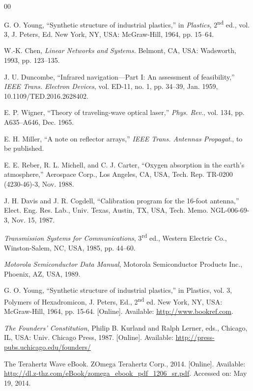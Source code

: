 \documentclass[journal,twoside,web]{ieeecolor}
\begin{document}
\begin{thebibliography}{00}

 G. O. Young, ``Synthetic structure of industrial plastics,'' in \emph{Plastics,} 2\textsuperscript{nd} ed., vol. 3, J. Peters, Ed. New York, NY, USA: McGraw-Hill, 1964, pp. 15--64.

 W.-K. Chen, \emph{Linear Networks and Systems.} Belmont, CA, USA: Wadsworth, 1993, pp. 123--135.

 J. U. Duncombe, ``Infrared navigation---Part I: An assessment of feasibility,'' \emph{IEEE Trans. Electron Devices}, vol. ED-11, no. 1, pp. 34--39, Jan. 1959, 10.1109/TED.2016.2628402.

 E. P. Wigner, ``Theory of traveling-wave optical laser,'' \emph{Phys. Rev}., vol. 134, pp. A635--A646, Dec. 1965.

 E. H. Miller, ``A note on reflector arrays,'' \emph{IEEE Trans. Antennas Propagat}., to be published.

 E. E. Reber, R. L. Michell, and C. J. Carter, ``Oxygen absorption in the earth's atmosphere,'' Aerospace Corp., Los Angeles, CA, USA, Tech. Rep. TR-0200 (4230-46)-3, Nov. 1988.

 J. H. Davis and J. R. Cogdell, ``Calibration program for the 16-foot antenna,'' Elect. Eng. Res. Lab., Univ. Texas, Austin, TX, USA, Tech. Memo. NGL-006-69-3, Nov. 15, 1987.

 \emph{Transmission Systems for Communications}, 3\textsuperscript{rd} ed., Western Electric Co., Winston-Salem, NC, USA, 1985, pp. 44--60.

 \emph{Motorola Semiconductor Data Manual}, Motorola Semiconductor Products Inc., Phoenix, AZ, USA, 1989.

 G. O. Young, ``Synthetic structure of industrial
plastics,'' in Plastics, vol. 3, Polymers of Hexadromicon, J. Peters,
Ed., 2\textsuperscript{nd} ed. New York, NY, USA: McGraw-Hill, 1964, pp. 15-64.
[Online]. Available:
\underline{http://www.bookref.com}.

 \emph{The Founders' Constitution}, Philip B. Kurland
and Ralph Lerner, eds., Chicago, IL, USA: Univ. Chicago Press, 1987.
[Online]. Available: \underline{http://press-pubs.uchicago.edu/founders/}

 The Terahertz Wave eBook. ZOmega Terahertz Corp., 2014.
[Online]. Available:
\underline{http://dl.z-thz.com/eBook/zomega\_ebook\_pdf\_1206\_sr.pdf}. Accessed on: May 19, 2014.


\end{thebibliography}
\end{document}
